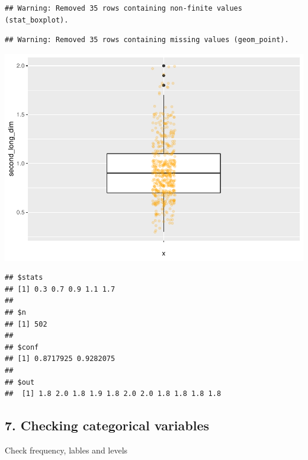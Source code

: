 \documentclass[]{article}
\newenvironment{Shaded}{\begin{snugshade}}{\end{snugshade}}
\newcommand{\KeywordTok}[1]{\textcolor[rgb]{0.13,0.29,0.53}{\textbf{#1}}}
\newcommand{\StringTok}[1]{\textcolor[rgb]{0.31,0.60,0.02}{#1}}
\newcommand{\OperatorTok}[1]{\textcolor[rgb]{0.81,0.36,0.00}{\textbf{#1}}}
\newcommand{\NormalTok}[1]{#1}
\begin{document}
\begin{verbatim}
## Warning: Removed 35 rows containing non-finite values (stat_boxplot).
\end{verbatim}

\begin{verbatim}
## Warning: Removed 35 rows containing missing values (geom_point).
\end{verbatim}

\includegraphics{figs/render-unnamed-chunk-23-1.pdf}

\begin{Shaded}
\end{Shaded}

\begin{verbatim}
## $stats
## [1] 0.3 0.7 0.9 1.1 1.7
## 
## $n
## [1] 502
## 
## $conf
## [1] 0.8717925 0.9282075
## 
## $out
##  [1] 1.8 2.0 1.8 1.9 1.8 2.0 2.0 1.8 1.8 1.8 1.8
\end{verbatim}

\subsection{7. Checking categorical
variables}\label{checking-categorical-variables}

Check frequency, lables and levels

\begin{Shaded}
\end{Shaded}
\end{document}

